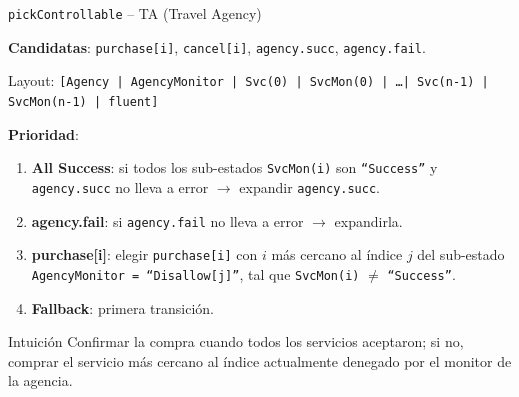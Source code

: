 \documentclass{beamer}
\begin{document}
\begin{frame}{\texttt{pickControllable} -- TA (Travel Agency)}

\textbf{Candidatas}: \texttt{purchase[i]}, \texttt{cancel[i]}, \texttt{agency.succ}, \texttt{agency.fail}.

{\small Layout: \texttt{[Agency | AgencyMonitor | Svc(0) | SvcMon(0) | \ldots | Svc(n{-}1) | SvcMon(n{-}1) | fluent]}}

\medskip
\textbf{Prioridad}:
\begin{enumerate}
  \item \textbf{All Success}: si todos los sub-estados \texttt{SvcMon(i)} son \texttt{``Success''} y \texttt{agency.succ} no lleva a error $\to$ expandir \texttt{agency.succ}.
  \item \textbf{agency.fail}: si \texttt{agency.fail} no lleva a error $\to$ expandirla.
  \item \textbf{purchase[i]}: elegir \texttt{purchase[i]} con $i$ m\'as cercano al \'indice $j$ del sub-estado \texttt{AgencyMonitor = ``Disallow[j]''}, tal que \texttt{SvcMon(i)} $\ne$ \texttt{``Success''}.
  \item \textbf{Fallback}: primera transici\'on.
\end{enumerate}

\medskip
\begin{block}{Intuici\'on}
Confirmar la compra cuando todos los servicios aceptaron; si no, comprar el servicio m\'as cercano al \'indice actualmente denegado por el monitor de la agencia.
\end{block}
\end{frame}

\newcommand{\cmap}[2]{%
  \begin{tikzpicture}[scale=0.135]
    \node[above, font=\bfseries\scriptsize, inner sep=1.5pt] at (7.5,15) {#1};
    \fill[black] (0,0) rectangle (15,15);
    #2
    \draw[gray!30, ultra thin, step=1] (0,0) grid (15,15);
    \draw[black, thin] (0,0) rectangle (15,15);
    \node[font=\tiny, below] at (0.5,-0.3)  {\tiny 1};
    \node[font=\tiny, below] at (14.5,-0.3) {\tiny 15};
    \node[font=\tiny, left]  at (-0.3,0.5)  {\tiny 1};
    \node[font=\tiny, left]  at (-0.3,14.5) {\tiny 15};
    \node[font=\tiny, below] at (7.5,-1.2) {\tiny$k$};
    \node[font=\tiny, left, rotate=90] at (-1.5,7.5) {\tiny$n$};
  \end{tikzpicture}%
}
\end{document}
